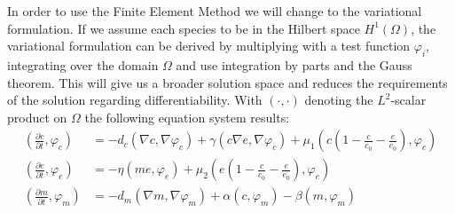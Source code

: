 In order to use the Finite Element Method we will change to the variational formulation. If we assume each species to be in the Hilbert space $H^1(\Omega)$, the variational formulation can be derived by multiplying with a test function $\varphi_i$, integrating over the domain $\Omega$ and use integration by parts and the Gauss theorem. This will give us a broader solution space and reduces the requirements of the solution regarding differentiability. With $\left(\cdot, \cdot\right)$ denoting the $L^2$-scalar product on $\Omega$ the following equation system results:
\begin{align}
    \left(\frac{\partial c}{\partial t}, \varphi_c\right) &=
        - d_c\left(\nabla c, \nabla \varphi_c\right) + \gamma \left(c\nabla e, \nabla \varphi_c\right) + \mu_1 \left(c \left(1-\frac{c}{c_0} - \frac{e}{e_0}\right), \varphi_c\right) \label{eq:11}\\
    \left(\frac{\partial e}{\partial t}, \varphi_e\right) &=  -\eta \left( me, \varphi_e\right) + \mu_2 \left(e\left(1-\frac{c}{c_0}-\frac{e}{e_0}\right),\varphi_e\right) \label{eq:12}\\
    \left(\frac{\partial m}{\partial t}, \varphi_m\right) &= -d_m \left(\nabla m,\nabla \varphi_m\right) + \alpha \left(c,\varphi_m\right) - \beta \left(m,\varphi_m\right) \label{eq:13}
\end{align}
